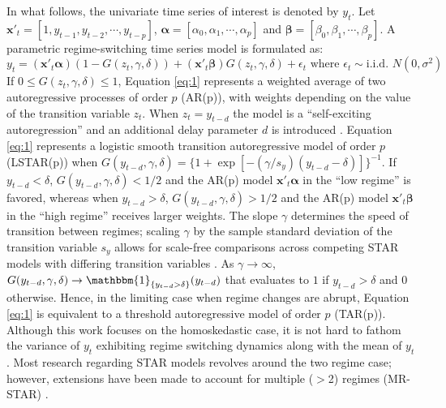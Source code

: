 In what follows, the univariate time series of interest is denoted by $y_t$. Let $\bm{x}'_t=[1,y_{t-1},y_{t-2}, \cdots, y_{t-p}]$, $\bm{\alpha}=[\alpha_0,\alpha_1,\cdots,\alpha_p]$ and $\bm{\beta}=[\beta_0,\beta_1,\cdots,\beta_p]$. A parametric regime-switching time series model is formulated as:
\begin{equation}
\label{eq:1}
y_t=(\bm{x}'_t\bm{\alpha})(1-G(z_{t},\gamma,\delta))+(\bm{x}'_t\bm{\beta})G(z_{t},\gamma,\delta)+\epsilon_t \textrm{ where } \epsilon_t \sim \textrm{i.i.d. } N(0,\sigma^2)
\end{equation}
If $0\leq G(z_{t},\gamma,\delta) \leq 1$, Equation \ref{eq:1} represents a weighted average of two autoregressive processes of order $p$ (AR(p)), with weights depending on the value of the transition variable $z_t$. When $z_t=y_{t-d}$ the model is a ``self-exciting autoregression'' and an additional delay parameter $d$ is introduced \citep{Petruccelli1984}. Equation \ref{eq:1} represents a logistic smooth transition autoregressive model of order $p$ (LSTAR(p)) when $G(y_{t-d},\gamma,\delta)=\{1+\exp[-(\gamma/s_y)(y_{t-d}-\delta)]\}^{-1}$. If $y_{t-d} < \delta$, $G(y_{t-d},\gamma,\delta) < 1/2$ and the AR(p) model $\bm{x}'_t\bm{\alpha}$ in the ``low regime'' is favored, whereas when $y_{t-d} > \delta$, $G(y_{t-d},\gamma,\delta) > 1/2$ and the AR(p) model $\bm{x}'_t\bm{\beta}$ in the ``high regime'' receives larger weights. The slope $\gamma$ determines the speed of transition between regimes; scaling $\gamma$ by the sample standard deviation of the transition variable $s_y$ allows for scale-free comparisons across competing STAR models with differing  transition variables \citep{Deschamps2008}. As $\gamma \to \infty$,  $G(y_{t-d},\gamma,\delta) \to \mathbbm{1}_{\{y_{t-d}>\delta\}}(y_{t-d})$ that evaluates to $1$ if $y_{t-d}>\delta$ and $0$ otherwise. Hence, in the limiting case when regime changes are abrupt, Equation \ref{eq:1} is equivalent to a threshold autoregressive model of order $p$ (TAR(p)). Although this work focuses on the homoskedastic case, it is not hard to fathom the variance of $y_t$ exhibiting regime switching dynamics along with the mean of $y_t$. Most research regarding STAR models revolves around the two regime case; however, extensions have been made to account for multiple ($>$2) regimes (MR-STAR) \citep{Terasvirta2010}. 

